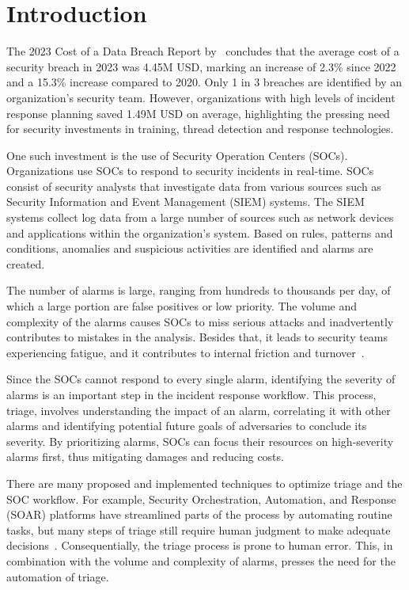 \section{Introduction}
\label{sec:introduction}

The 2023 Cost of a Data Breach Report by\ \citet{ibm2023cost} concludes that the average cost of a security breach in
2023 was 4.45M USD, marking an increase of 2.3\% since 2022 and a 15.3\% increase compared to 2020.
Only 1 in 3 breaches are identified by an organization's security team.
However, organizations with high levels of incident response planning saved 1.49M USD on average, highlighting the
pressing need for security investments in training, thread detection and response technologies.

One such investment is the use of Security Operation Centers (SOCs).
Organizations use SOCs to respond to security incidents in real-time.
SOCs consist of security analysts that investigate data from various sources such as Security Information and Event
Management (SIEM) systems.
The SIEM systems collect log data from a large number of sources such as network devices and applications within the
organization's system.
Based on rules, patterns and conditions, anomalies and suspicious activities are identified and alarms are created.

The number of alarms is large, ranging from hundreds to thousands per day, of which a large portion are false positives
or low priority.
The volume and complexity of the alarms causes SOCs to miss serious attacks and inadvertently contributes to mistakes in
the analysis.
Besides that, it leads to security teams experiencing fatigue, and it contributes to internal friction and
turnover\ \citep{orca2022fatigue}.

Since the SOCs cannot respond to every single alarm, identifying the severity of alarms is an important step in the
incident response workflow.
This process, triage, involves understanding the impact of an alarm, correlating it with other alarms and identifying
potential future goals of adversaries to conclude its severity.
By prioritizing alarms, SOCs can focus their resources on high-severity alarms first, thus mitigating damages and
reducing costs.

There are many proposed and implemented techniques to optimize triage and the SOC workflow.
For example, Security Orchestration, Automation, and Response (SOAR) platforms have streamlined parts of the process by
automating routine tasks, but many steps of triage still require human judgment to make adequate
decisions\ \citep{chuvakin2019triaging}.
Consequentially, the triage process is prone to human error.
This, in combination with the volume and complexity of alarms, presses the need for the automation of triage.

